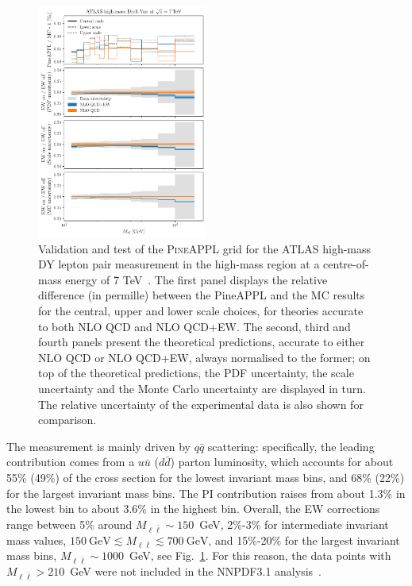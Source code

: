 \begin{figure}[!t]
    \centering
    \includegraphics[width=0.5\textwidth]{figures/pineappl_ATLASZHIGHMASS49FB}
    \caption{Validation and test of the \textsc{PineAPPL} grid for the ATLAS
      high-mass DY lepton pair measurement in the high-mass region at
      a centre-of-mass energy of 7 TeV~\cite{Aad:2013iua}. The first panel
      displays the relative difference (in permille) between the {\sc PineAPPL}
      and the {\sc MC} results for the central, upper and lower scale choices,
      for theories accurate to both NLO QCD and NLO QCD+EW. The second, third
      and fourth panels present the theoretical predictions, accurate to either
      NLO QCD or NLO QCD+EW, always normalised to the former; on top of the
      theoretical predictions, the PDF uncertainty, the scale uncertainty and
      the Monte Carlo uncertainty are displayed in turn. The relative
      uncertainty of the experimental data is also shown for comparison.}
    \label{fig:atlaszhighmass49fb}
\end{figure}

The measurement is mainly driven by $q\bar q$ scattering: specifically, the
leading contribution comes from a $u\bar{u}$ ($d\bar{d}$) parton luminosity,
which accounts for about 55\% (49\%) of the cross section for the lowest
invariant mass bins, and 68\% (22\%) for the largest invariant mass bins.
The PI contribution raises from about 1.3\% in the lowest bin to about 3.6\% in
the highest bin. Overall, the EW corrections range between 5\% around
$M_{\ell\bar\ell}\sim 150$~GeV, 2\%-3\% for intermediate invariant mass values,
$150~\textrm{GeV}\lesssim M_{\ell\bar\ell}\lesssim 700~\textrm{GeV}$, and
15\%-20\% for the largest invariant mass bins, $M_{\ell\bar\ell}\sim 1000$~GeV,
see Fig.~\ref{fig:atlaszhighmass49fb}. For this reason, the data points with
$M_{\ell\bar\ell}>210$~GeV were not included in the NNPDF3.1
analysis~\cite{Ball:2017nwa}.

